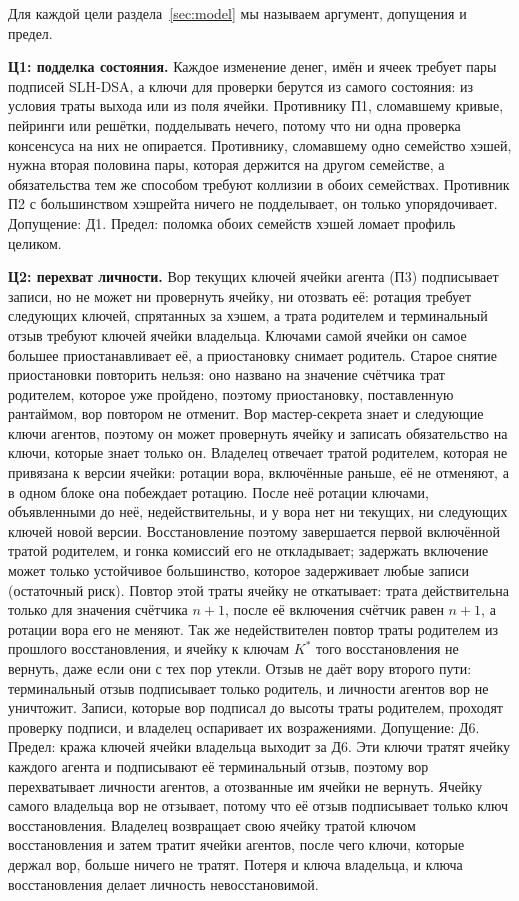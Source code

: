 \documentclass[10pt,a4paper]{article}
\begin{document}
Для каждой цели раздела~\ref{sec:model} мы называем аргумент, допущения и предел.

\textbf{Ц1: подделка состояния.}
Каждое изменение денег, имён и ячеек требует пары подписей SLH-DSA, а ключи для проверки берутся из самого состояния: из условия траты выхода или из поля ячейки.
Противнику П1, сломавшему кривые, пейринги или решётки, подделывать нечего, потому что ни одна проверка консенсуса на них не опирается.
Противнику, сломавшему одно семейство хэшей, нужна вторая половина пары, которая держится на другом семействе, а обязательства тем же способом требуют коллизии в обоих семействах.
Противник П2 с большинством хэшрейта ничего не подделывает, он только упорядочивает.
Допущение: Д1.
Предел: поломка обоих семейств хэшей ломает профиль целиком.

\textbf{Ц2: перехват личности.}
Вор текущих ключей ячейки агента (П3) подписывает записи, но не может ни провернуть ячейку, ни отозвать её: ротация требует следующих ключей, спрятанных за хэшем, а трата родителем и терминальный отзыв требуют ключей ячейки владельца.
Ключами самой ячейки он самое большее приостанавливает её, а приостановку снимает родитель.
Старое снятие приостановки повторить нельзя: оно названо на значение счётчика трат родителем, которое уже пройдено, поэтому приостановку, поставленную рантаймом, вор повтором не отменит.
Вор мастер-секрета знает и следующие ключи агентов, поэтому он может провернуть ячейку и записать обязательство на ключи, которые знает только он.
Владелец отвечает тратой родителем, которая не привязана к версии ячейки: ротации вора, включённые раньше, её не отменяют, а в одном блоке она побеждает ротацию.
После неё ротации ключами, объявленными до неё, недействительны, и у вора нет ни текущих, ни следующих ключей новой версии.
Восстановление поэтому завершается первой включённой тратой родителем, и гонка комиссий его не откладывает; задержать включение может только устойчивое большинство, которое задерживает любые записи (остаточный риск).
Повтор этой траты ячейку не откатывает: трата действительна только для значения счётчика $n{+}1$, после её включения счётчик равен $n{+}1$, а ротации вора его не меняют.
Так же недействителен повтор траты родителем из прошлого восстановления, и ячейку к ключам $K^{*}$ того восстановления не вернуть, даже если они с тех пор утекли.
Отзыв не даёт вору второго пути: терминальный отзыв подписывает только родитель, и личности агентов вор не уничтожит.
Записи, которые вор подписал до высоты траты родителем, проходят проверку подписи, и владелец оспаривает их возражениями.
Допущение: Д6.
Предел: кража ключей ячейки владельца выходит за Д6.
Эти ключи тратят ячейку каждого агента и подписывают её терминальный отзыв, поэтому вор перехватывает личности агентов, а отозванные им ячейки не вернуть.
Ячейку самого владельца вор не отзывает, потому что её отзыв подписывает только ключ восстановления.
Владелец возвращает свою ячейку тратой ключом восстановления и затем тратит ячейки агентов, после чего ключи, которые держал вор, больше ничего не тратят.
Потеря и ключа владельца, и ключа восстановления делает личность невосстановимой.
\end{document}
